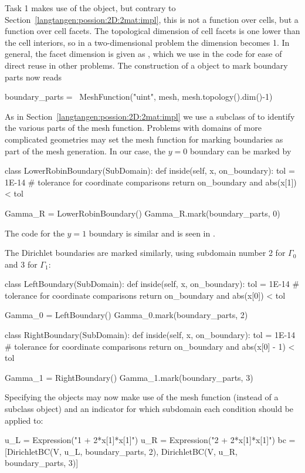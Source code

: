 Task 1 makes use of the  object, but contrary to
Section~\ref{langtangen:possion:2D:2mat:impl}, this is not a function over
cells, but a function over cell facets. The topological dimension of
cell facets is one lower than the cell interiors, so in a two-dimensional
problem the dimension
becomes 1. In general, the facet dimension
is given as ,
which we use in the code for ease of direct reuse in other problems.
The construction of a  object to mark boundary parts
now reads
\begin{python}
boundary_parts = \
  MeshFunction("uint", mesh, mesh.topology().dim()-1)
\end{python}
As in Section~\ref{langtangen:possion:2D:2mat:impl} we
use a subclass of  to identify the various parts
of the mesh function. Problems with domains of more complicated geometries may
set the mesh function for marking boundaries as part of the mesh
generation.
In our case, the $y=0$ boundary can be marked by
\begin{python}
class LowerRobinBoundary(SubDomain):
    def inside(self, x, on_boundary):
        tol = 1E-14   # tolerance for coordinate comparisons
        return on_boundary and abs(x[1]) < tol

Gamma_R = LowerRobinBoundary()
Gamma_R.mark(boundary_parts, 0)
\end{python}
The code for the $y=1$ boundary is similar and is seen in
.

The Dirichlet boundaries are marked similarly, using subdomain number 2 for $\Gamma_0$ and 3 for $\Gamma_1$:
\begin{python}
class LeftBoundary(SubDomain):
    def inside(self, x, on_boundary):
        tol = 1E-14   # tolerance for coordinate comparisons
        return on_boundary and abs(x[0]) < tol

Gamma_0 = LeftBoundary()
Gamma_0.mark(boundary_parts, 2)

class RightBoundary(SubDomain):
    def inside(self, x, on_boundary):
        tol = 1E-14   # tolerance for coordinate comparisons
        return on_boundary and abs(x[0] - 1) < tol

Gamma_1 = RightBoundary()
Gamma_1.mark(boundary_parts, 3)
\end{python}
Specifying the  objects may now make use of
the mesh function (instead of a  subclass object)
and an indicator for which subdomain each condition
should be applied to:
\begin{python}
u_L = Expression("1 + 2*x[1]*x[1]")
u_R = Expression("2 + 2*x[1]*x[1]")
bc = [DirichletBC(V, u_L, boundary_parts, 2),
      DirichletBC(V, u_R, boundary_parts, 3)]
\end{python}

